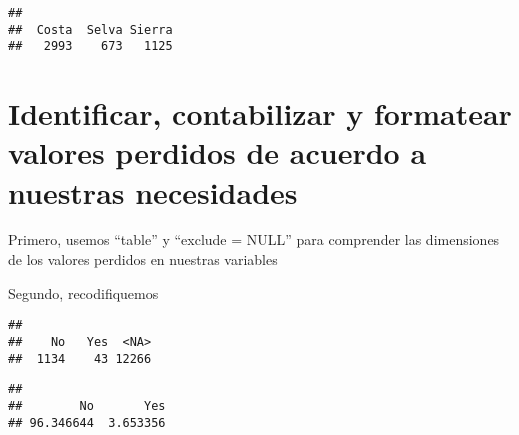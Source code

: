 \documentclass[
]{article}
\newenvironment{Shaded}{\begin{snugshade}}{\end{snugshade}}
\newcommand{\AttributeTok}[1]{\textcolor[rgb]{0.13,0.29,0.53}{#1}}
\newcommand{\ConstantTok}[1]{\textcolor[rgb]{0.56,0.35,0.01}{#1}}
\newcommand{\DecValTok}[1]{\textcolor[rgb]{0.00,0.00,0.81}{#1}}
\newcommand{\DocumentationTok}[1]{\textcolor[rgb]{0.56,0.35,0.01}{\textbf{\textit{#1}}}}
\newcommand{\FunctionTok}[1]{\textcolor[rgb]{0.13,0.29,0.53}{\textbf{#1}}}
\newcommand{\NormalTok}[1]{#1}
\newcommand{\OtherTok}[1]{\textcolor[rgb]{0.56,0.35,0.01}{#1}}
\newcommand{\SpecialCharTok}[1]{\textcolor[rgb]{0.81,0.36,0.00}{\textbf{#1}}}
\newcommand{\StringTok}[1]{\textcolor[rgb]{0.31,0.60,0.02}{#1}}
\begin{document}
\begin{verbatim}
## 
##  Costa  Selva Sierra 
##   2993    673   1125
\end{verbatim}

\hypertarget{identificar-contabilizar-y-formatear-valores-perdidos-de-acuerdo-a-nuestras-necesidades}{%
\section{Identificar, contabilizar y formatear valores perdidos de
acuerdo a nuestras
necesidades}\label{identificar-contabilizar-y-formatear-valores-perdidos-de-acuerdo-a-nuestras-necesidades}}

Primero, usemos ``table'' y ``exclude = NULL'' para comprender las
dimensiones de los valores perdidos en nuestras variables

Segundo, recodifiquemos

\begin{Shaded}
\end{Shaded}

\begin{verbatim}
## 
##    No   Yes  <NA> 
##  1134    43 12266
\end{verbatim}

\begin{Shaded}
\end{Shaded}

\begin{verbatim}
## 
##        No       Yes 
## 96.346644  3.653356
\end{verbatim}
\end{document}
